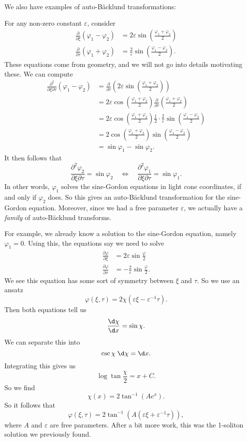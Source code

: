 \documentclass[a4paper]{article}
\begin{document}
We also have examples of auto-B\"acklund transformations:
\begin{eg}
  For any non-zero constant $\varepsilon$, consider
  \begin{align*}
    \frac{\partial}{\partial \xi}(\varphi_1 - \varphi_2) &= 2 \varepsilon \sin \left(\frac{\varphi_1 + \varphi_2}{2}\right)\\
    \frac{\partial}{\partial \tau}(\varphi_1 + \varphi_2) &= \frac{2}{\varepsilon} \sin\left(\frac{\varphi_1 - \varphi_2}{2}\right).
  \end{align*}
  These equations come from geometry, and we will not go into details motivating these. We can compute
  \begin{align*}
    \frac{\partial^2}{\partial \xi\partial \tau} (\varphi_1 - \varphi_2) &= \frac{\partial}{\partial \tau}\left(2\varepsilon \sin \left(\frac{\varphi_1 + \varphi_2}{2}\right)\right)\\
    &= 2\varepsilon \cos \left(\frac{\varphi_1 + \varphi_2}{2}\right)\frac{\partial}{\partial \tau}\left(\frac{\varphi_1 + \varphi_2}{2}\right)\\
    &= 2 \varepsilon \cos \left(\frac{\varphi_1 + \varphi_2}{2}\right) \frac{1}{2} \cdot \frac{2}{\varepsilon} \sin \left(\frac{\varphi_1 - \varphi_2}{2}\right)\\
    &= 2 \cos \left(\frac{\varphi_1 + \varphi_2}{2}\right)\sin \left(\frac{\varphi_1 - \varphi_2}{2}\right)\\
    &= \sin \varphi_1 - \sin \varphi_2.
  \end{align*}
  It then follows that
  \[
    \frac{\partial^2 \varphi_2}{\partial \xi \partial \tau} = \sin \varphi_2\quad\Longleftrightarrow\quad \frac{\partial^2 \varphi_1}{\partial \xi \partial \tau} = \sin \varphi_1.
  \]
  In other words, $\varphi_1$ solves the sine-Gordon equations in light cone coordinates, if and only if $\varphi_2$ does. So this gives an auto-B\"acklund transformation for the sine-Gordon equation. Moreover, since we had a free parameter $\varepsilon$, we actually have a \emph{family} of auto-B\"acklund transforms.

  For example, we already know a solution to the sine-Gordon equation, namely $\varphi_1 = 0$. Using this, the equations say we need to solve
  \begin{align*}
    \frac{\partial \varphi}{\partial \xi} &= 2\varepsilon \sin \frac{\varphi}{2}\\
    \frac{\partial \varphi}{\partial \tau} &= -\frac{2}{\varepsilon} \sin \frac{\varphi}{2}.
  \end{align*}
  We see this equation has some sort of symmetry between $\xi$ and $\tau$. So we use an ansatz
  \[
    \varphi(\xi, \tau) = 2\chi (\varepsilon \xi - \varepsilon^{-1} \tau).
  \]
  Then both equations tell us
  \[
    \frac{\d \chi}{\d x} = \sin \chi.
  \]
  We can separate this into
  \[
    \csc \chi \;\d \chi = \d x.
  \]
  Integrating this gives us
  \[
    \log \tan \frac{\chi}{2} = x + C.
  \]
  So we find
  \[
    \chi(x) = 2\tan^{-1} (Ae^x).
  \]
  So it follows that
  \[
    \varphi(\xi, \tau) = 2 \tan^{-1} (A (\varepsilon \xi + \varepsilon^{-1}\tau)),
  \]
  where $A$ and $\varepsilon$ are free parameters. After a bit more work, this was the 1-soliton solution we previously found.


\end{eg}
\end{document}
